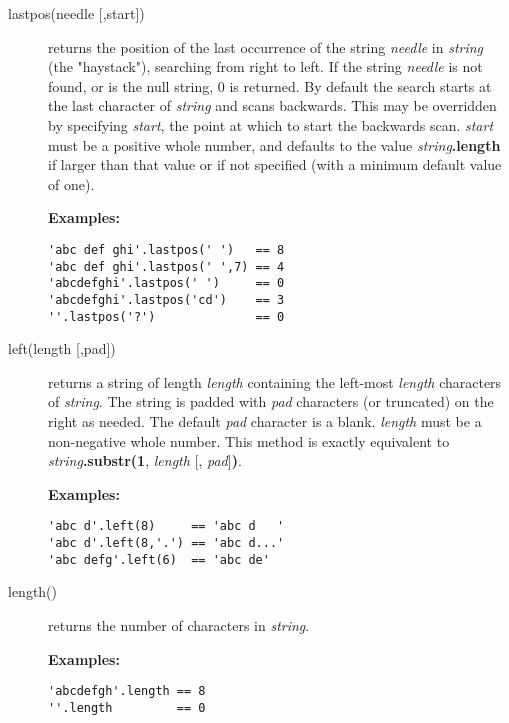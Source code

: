 \begin{description}
\item[lastpos(needle [,start{]})]\label{reflastpos}
returns the position of the last occurrence of the string
\emph{needle} in \emph{string} (the "haystack"), searching
from right to left.
If the string \emph{needle} is not found, or is the null string,
0 is returned.
By default the search starts at the last character of
\emph{string} and scans backwards.
This may be overridden by specifying \emph{start}, the point at
which to start the backwards scan.
\emph{start} must be a positive whole number, and defaults to the
value \emph{string}\textbf{.length} if larger than that
value or if not specified (with a minimum default value of one).
 
\textbf{Examples:}
\begin{lstlisting}
'abc def ghi'.lastpos(' ')   == 8
'abc def ghi'.lastpos(' ',7) == 4
'abcdefghi'.lastpos(' ')     == 0
'abcdefghi'.lastpos('cd')    == 3
''.lastpos('?')              == 0
\end{lstlisting}

\item[left(length [,pad{]})]\label{refleft}
returns a string of length \emph{length} containing the
left-most \emph{length} characters of \emph{string}.
The string is padded with \emph{pad} characters (or truncated) on
the right as needed.
The default \emph{pad} character is a blank.
\emph{length} must be a non-negative whole number.
This method is exactly equivalent to
\emph{string}\textbf{.substr(1}, \emph{length}
[, \emph{pad}]\textbf{)}.
 
\textbf{Examples:}
\begin{lstlisting}
'abc d'.left(8)     == 'abc d   '
'abc d'.left(8,'.') == 'abc d...'
'abc defg'.left(6)  == 'abc de'
\end{lstlisting}

\item[length()]\label{reflength}
returns the number of characters in \emph{string}.

\textbf{Examples:}
\begin{lstlisting}
'abcdefgh'.length == 8
''.length         == 0
\end{lstlisting}


\end{description}
